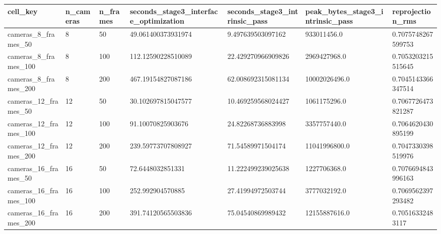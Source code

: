\begin{tabular}{|l|l|l|l|l|l|l|}
\hline
cell\_key & n\_cameras & n\_frames & seconds\_stage3\_interface\_optimization & seconds\_stage3\_intrinsic\_pass & peak\_bytes\_stage3\_intrinsic\_pass & reprojection\_rms \\
\hline
cameras\_8\_frames\_50 & 8 & 50 & 49.061400373931974 & 9.497639503097162 & 933011456.0 & 0.7075748267599753 \\
cameras\_8\_frames\_100 & 8 & 100 & 112.12590228510089 & 22.429270966909826 & 2969427968.0 & 0.7053203215515645 \\
cameras\_8\_frames\_200 & 8 & 200 & 467.19154827087186 & 62.008692315081134 & 10002026496.0 & 0.7045143366347514 \\
cameras\_12\_frames\_50 & 12 & 50 & 30.102697815047577 & 10.469259568024427 & 1061175296.0 & 0.7067726473821287 \\
cameras\_12\_frames\_100 & 12 & 100 & 91.10070825903676 & 24.82268736883998 & 3357757440.0 & 0.7064620430895199 \\
cameras\_12\_frames\_200 & 12 & 200 & 239.59773707808927 & 71.54589971504174 & 11041996800.0 & 0.7047330398519976 \\
cameras\_16\_frames\_50 & 16 & 50 & 72.6448032851331 & 11.222499239025638 & 1227706368.0 & 0.7076694843996163 \\
cameras\_16\_frames\_100 & 16 & 100 & 252.992904570885 & 27.41994972503744 & 3777032192.0 & 0.7069562397293482 \\
cameras\_16\_frames\_200 & 16 & 200 & 391.74120565503836 & 75.04540869989432 & 12155887616.0 & 0.70516332483117 \\
\hline
\end{tabular}


